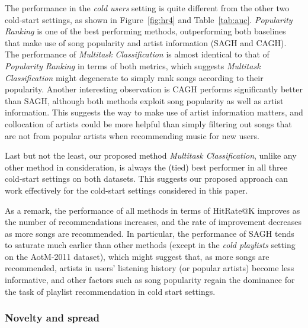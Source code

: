 The performance in the \emph{cold users} setting %
is quite different from the other two cold-start settings, as shown in Figure~\ref{fig:hr4} and Table~\ref{tab:auc}.
{\it Popularity Ranking} is one of the best performing methods,
outperforming both baselines that make use of song popularity and artist information (\ie SAGH and CAGH).
The performance of {\it Multitask Classification} is almost identical to that of {\it Popularity Ranking} in terms of both metrics,
which suggests {\it Multitask Classification} might degenerate to simply rank songs according to their popularity.
Another interesting observation is CAGH performs significantly better than SAGH,
although both methods exploit song popularity as well as artist information.
This suggests the way to make use of artist information matters,
and collocation of artists could be more helpful than simply filtering out songs that are not from popular artists
when recommending music for new users.

Last but not the least, our proposed method {\it Multitask Classification}, unlike any other method in consideration,
is always the (tied) best performer in all three cold-start settings on both datasets.
This suggests our proposed approach can work effectively for the cold-start settings considered in this paper.

As a remark, the performance of all methods in terms of HitRate@K improves as the number of recommendations increases,
and the rate of improvement decreases as more songs are recommended.
In particular, the performance of SAGH tends to saturate much earlier than other methods 
(except in the \emph{cold playlists} setting on the AotM-2011 dataset),
which might suggest that, as more songs are recommended, artists in users' listening history (or popular artists) become less informative,
and other factors such as song popularity regain the dominance for the task of playlist recommendation in cold start settings.


\subsubsection{Novelty and spread}

